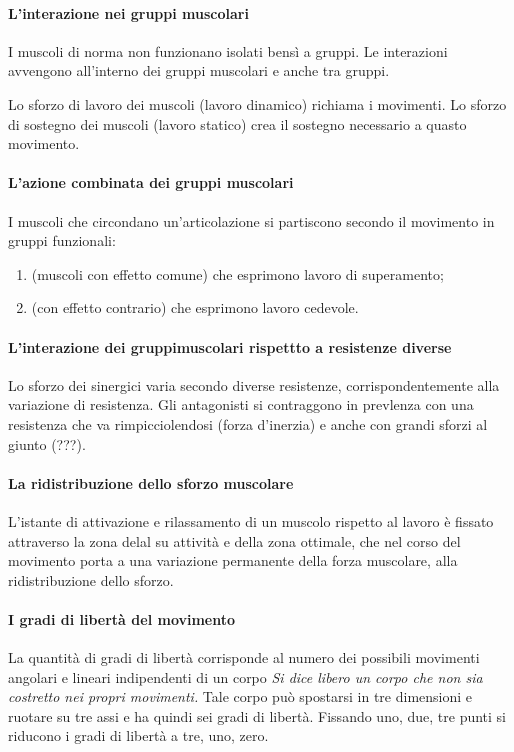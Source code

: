 \paragraph {L'interazione nei gruppi muscolari}
I muscoli di norma non funzionano isolati bens\`i a gruppi.
Le interazioni avvengono all'interno dei gruppi muscolari e anche tra gruppi.

Lo sforzo di lavoro dei muscoli (lavoro dinamico) richiama i movimenti.
Lo sforzo di sostegno dei muscoli (lavoro statico) crea il sostegno necessario a quasto movimento.

\paragraph {L'azione combinata dei gruppi muscolari}
I muscoli che circondano un'articolazione si partiscono secondo il movimento in gruppi funzionali:
\begin {enumerate}
	\item [Sinergici] (muscoli con effetto comune) che esprimono lavoro di superamento;
	\item [Antagonisti] (con effetto contrario) che esprimono lavoro cedevole.
\end {enumerate}

\paragraph {L'interazione dei gruppimuscolari rispettto a resistenze diverse}
Lo sforzo dei sinergici varia secondo diverse resistenze,
corrispondentemente alla variazione di resistenza.
Gli antagonisti si contraggono in prevlenza con una resistenza che va rimpicciolendosi
(forza d'inerzia) e anche con grandi sforzi al giunto (???).

\paragraph {La ridistribuzione dello sforzo muscolare}
L'istante di attivazione e rilassamento di un muscolo rispetto al lavoro
\`e fissato attraverso la zona delal su attivit\`a e della zona ottimale,
che nel corso del movimento porta a una variazione permanente della forza muscolare,
alla ridistribuzione dello sforzo.

\paragraph {I gradi di libert\`a del movimento}
La quantit\`a di gradi di libert\`a corrisponde al numero dei possibili movimenti
angolari e lineari indipendenti di un corpo
\textit {Si dice \emph {libero} un corpo che non sia costretto nei propri movimenti.}
Tale corpo pu\`o spostarsi in tre dimensioni e ruotare su tre assi
e ha quindi sei gradi di libert\`a.
Fissando uno, due, tre punti si riducono i gradi di libert\`a a tre, uno, zero.

